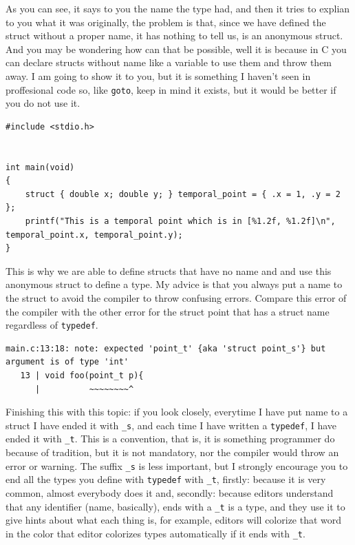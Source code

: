 \documentclass[a4paper]{article}
\begin{document}
As you can see, it says to you the name the type had, and then it tries to
explian to you what it was originally, the problem is that, since we have
defined the struct without a proper name, it has nothing to tell us, is an
anonymous struct. And you may be wondering how can that be possible, well it is
because in C you can declare structs without name like a variable to use them
and throw them away. I am going to show it to you, but it is something I haven't
seen in proffesional code so, like \verb!goto!, keep in mind it exists, but
it would be better if you do not use it.

\noindent
\begin{minipage}[H]{\linewidth}
\mbox{}
\begin{lstlisting}[style=C,
caption={Anonymous struct},
label={lst:anonymousStruct}]
#include <stdio.h>


int main(void)
{
    struct { double x; double y; } temporal_point = { .x = 1, .y = 2 };
    printf("This is a temporal point which is in [%1.2f, %1.2f]\n", temporal_point.x, temporal_point.y);
}
\end{lstlisting}
\end{minipage}

This is why we are able to define structs that have no name and and use this
anonymous struct to define a type. My advice is that you always put a name
to the struct to avoid the compiler to throw confusing errors. Compare this
error of the compiler with the other error for the struct point that has a
struct name regardless of \verb"typedef".

\begin{lstlisting}[style=terminalStyle]
main.c:13:18: note: expected 'point_t' {aka 'struct point_s'} but argument is of type 'int'
   13 | void foo(point_t p){
      |          ~~~~~~~~^
\end{lstlisting}

Finishing this with this topic: if you look closely, everytime I have put name
to a struct I have ended it with \verb!_s!, and each time I have written a
\verb!typedef!, I have ended it with \verb!_t!. This is a convention, that is,
it is something programmer do because of tradition, but it is not mandatory,
nor the compiler would throw an error or warning. The suffix \verb!_s! is less
important, but I strongly encourage you to end all the types you define with
\verb"typedef" with \verb!_t!, firstly: because it is very common, almost
everybody does it and, secondly: because editors understand that any
identifier (name, basically), ends with a \verb!_t! is a type, and they use
it to give hints about what each thing is, for example, editors will colorize
that word in the color that editor colorizes types automatically if it ends with
\verb!_t!.
\end{document}
